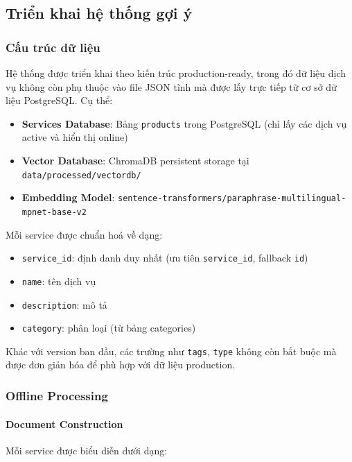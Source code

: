 \subsection{Triển khai hệ thống gợi ý}

\subsubsection{Cấu trúc dữ liệu}

Hệ thống được triển khai theo kiến trúc production-ready, trong đó dữ liệu dịch vụ không còn phụ thuộc vào file JSON tĩnh mà được lấy trực tiếp từ cơ sở dữ liệu PostgreSQL. Cụ thể:

\begin{itemize}
    \item \textbf{Services Database}: Bảng \texttt{products} trong PostgreSQL (chỉ lấy các dịch vụ active và hiển thị online)
    \item \textbf{Vector Database}: ChromaDB persistent storage tại \texttt{data/processed/vectordb/}
    \item \textbf{Embedding Model}: \texttt{sentence-transformers/paraphrase-multilingual-mpnet-base-v2}
\end{itemize}

Mỗi service được chuẩn hoá về dạng:

\begin{itemize}
    \item \texttt{service\_id}: định danh duy nhất (ưu tiên \texttt{service\_id}, fallback \texttt{id})
    \item \texttt{name}: tên dịch vụ
    \item \texttt{description}: mô tả
    \item \texttt{category}: phân loại (từ bảng categories)
\end{itemize}

Khác với version ban đầu, các trường như \texttt{tags}, \texttt{type} không còn bắt buộc mà được đơn giản hóa để phù hợp với dữ liệu production.

\subsubsection{Offline Processing}

\paragraph{Document Construction}

Mỗi service được biểu diễn dưới dạng:

